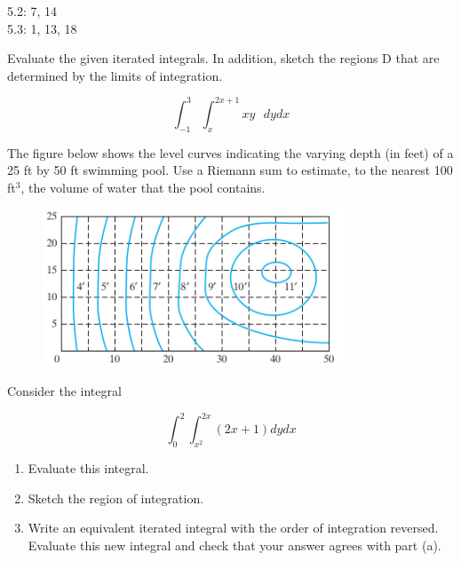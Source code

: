 \documentclass[11pt,letterpaper,boxed]{pset}
\begin{document}
    \begin{center}
    	5.2: 7, 14\\
    	5.3: 1, 13, 18\\
    \end{center}
    
    \begin{problem} [5.2.7]
    	Evaluate the given iterated integrals. In addition, sketch the regions D that are determined by the limits of integration.
    
    	\[\int_{-1}^{3} \int_{x}^{2x+1} xy \textrm{ } dy dx\]
    \end{problem}
    \newpage
    
    
    \begin{problem} [5.2.14]
    	The figure below shows the level curves indicating the varying depth (in feet) of a 25 ft by 50 ft swimming pool. Use a Riemann sum to estimate, to the nearest 100 ft$^3$, the volume of water that the pool contains.
    \end{problem}
    
    \begin{figure} [h!]
            \includegraphics[width=90mm]{pool.png}
    \end{figure}
    \newpage
    
    
    \begin{problem} [5.3.1]
    	Consider the integral
    
    	\[\int_{0}^{2} \int_{x^2}^{2x} (2x + 1) dydx\]
    	
    	\begin{enumerate}
    	    \item Evaluate this integral.
    	    \item Sketch the region of integration.
    	    \item Write an equivalent iterated integral with the order of integration reversed. Evaluate this new integral and check that your answer agrees with part (a).
    	\end{enumerate}
    	
    \end{problem}
    \newpage
    
\end{document}
